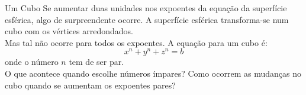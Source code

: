 \begin{surferPage}{Um Cubo}
Se aumentar duas unidades nos expoentes da equa\c c\~ao da superf\'icie esf\'erica, algo de surpreendente ocorre. A superf\'icie esf\'erica transforma-se num cubo com os v\'ertices arredondados.\\
\vspace{0.3cm}
Mas tal n\~ao ocorre para todos os expoentes. A equa\c c\~ao para um cubo \'e:
\[x^n+y^n+z^n=b\]
onde o n\'umero $n$ tem de ser par.\\
\vspace{0.3cm}
O que acontece quando  escolhe n\'umeros \'impares? Como ocorrem as mudan\c cas no cubo quando se aumentam os expoentes pares?
\end{surferPage}
